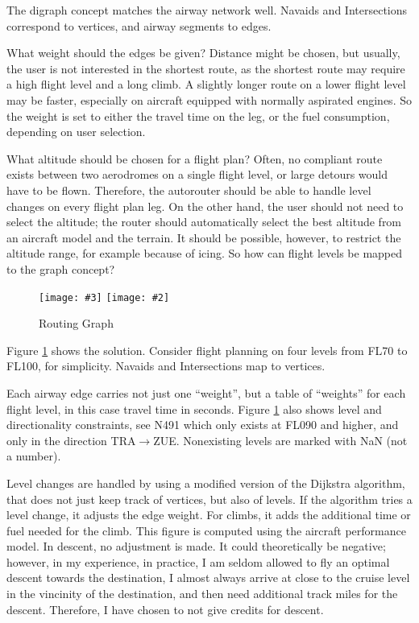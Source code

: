 \documentclass[a4paper,10pt,pdftex]{article}
\newcommand{\jnxfig}[3][]{\ifmypdf\texttt{[image: \#3]}
  \else\texttt{[image: \#2]}\fi}
\begin{document}
The digraph concept matches the airway network well. Navaids and
Intersections correspond to vertices, and airway segments to edges.

What weight should the edges be given? Distance might be chosen, but
usually, the user is not interested in the shortest route, as the
shortest route may require a high flight level and a long climb. A
slightly longer route on a lower flight level may be faster,
especially on aircraft equipped with normally aspirated engines. So
the weight is set to either the travel time on the leg, or the fuel
consumption, depending on user selection.

What altitude should be chosen for a flight plan? Often, no compliant
route exists between two aerodromes on a single flight level, or large
detours would have to be flown. Therefore, the autorouter should be
able to handle level changes on every flight plan leg. On the other
hand, the user should not need to select the altitude; the router
should automatically select the best altitude from an aircraft model
and the terrain. It should be possible, however, to restrict the
altitude range, for example because of icing. So how can flight levels
be mapped to the graph concept?

\noindent\begin{figure}[!htbp]
  \begin{center}
    \jnxfig[scale=0.7]{vertex.eps}{vertex.pdf}
    \caption{Routing Graph}
    \label{fig:vertex}
  \end{center}
\end{figure}

Figure \ref{fig:vertex} shows the solution. Consider flight
planning on four levels from FL70 to FL100, for simplicity. Navaids
and Intersections map to vertices.

Each airway edge carries not just one ``weight'', but a table of
``weights'' for each flight level, in this case travel time in
seconds. Figure \ref{fig:vertex} also shows level and
directionality constraints, see N491 which only exists at FL090 and
higher, and only in the direction TRA$\rightarrow$ZUE. Nonexisting
levels are marked with NaN (not a number).

Level changes are handled by using a modified version of the Dijkstra
algorithm, that does not just keep track of vertices, but also of
levels. If the algorithm tries a level change, it adjusts the edge
weight. For climbs, it adds the additional time or fuel needed for the
climb. This figure is computed using the aircraft performance
model. In descent, no adjustment is made. It could theoretically be
negative; however, in my experience, in practice, I am seldom allowed
to fly an optimal descent towards the destination, I almost always
arrive at close to the cruise level in the vincinity of the
destination, and then need additional track miles for the
descent. Therefore, I have chosen to not give credits for descent.
\end{document}
